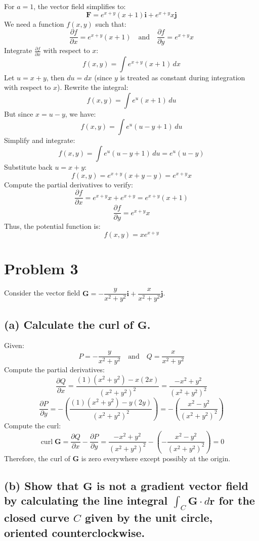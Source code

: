 \documentclass[11pt]{article}
\begin{document}
For $a = 1$, the vector field simplifies to:
\[
\mathbf{F} = e^{x + y} (x + 1)\mathbf{i} + e^{x + y} x \mathbf{j}
\]
We need a function $f(x, y)$ such that:
\[
\frac{\partial f}{\partial x} = e^{x + y} (x + 1) \quad \text{and} \quad \frac{\partial f}{\partial y} = e^{x + y} x
\]
Integrate $\frac{\partial f}{\partial x}$ with respect to $x$:
\[
f(x, y) = \int e^{x + y} (x + 1) \, dx
\]
Let $u = x + y$, then $du = dx$ (since $y$ is treated as constant during integration with respect to $x$). Rewrite the integral:
\[
f(x, y) = \int e^{u} (x + 1) \, du
\]
But since $x = u - y$, we have:
\[
f(x, y) = \int e^{u} (u - y + 1) \, du
\]
Simplify and integrate:
\[
f(x, y) = \int e^{u} (u - y + 1) \, du = e^{u} (u - y)
\]
Substitute back $u = x + y$:
\[
f(x, y) = e^{x + y} (x + y - y) = e^{x + y} x
\]
Compute the partial derivatives to verify:
\[
\frac{\partial f}{\partial x} = e^{x + y} x + e^{x + y} = e^{x + y} (x + 1)
\]
\[
\frac{\partial f}{\partial y} = e^{x + y} x
\]
Thus, the potential function is:
\[
f(x, y) = x e^{x + y}
\]

\newpage

\section{Problem 3}

Consider the vector field $\mathbf{G} = -\dfrac{y}{x^2 + y^2} \mathbf{i} + \dfrac{x}{x^2 + y^2} \mathbf{j}$.

\newpage

\subsection{(a) Calculate the curl of $\mathbf{G}$.}

Given:
\[
P = -\dfrac{y}{x^2 + y^2} \quad \text{and} \quad Q = \dfrac{x}{x^2 + y^2}
\]
Compute the partial derivatives:
\[
\frac{\partial Q}{\partial x} = \frac{(1)(x^2 + y^2) - x(2x)}{(x^2 + y^2)^2} = \frac{-x^2 + y^2}{(x^2 + y^2)^2}
\]
\[
\frac{\partial P}{\partial y} = -\left( \frac{(1)(x^2 + y^2) - y(2y)}{(x^2 + y^2)^2} \right) = -\left( \frac{x^2 - y^2}{(x^2 + y^2)^2} \right)
\]
Compute the curl:
\[
\operatorname{curl} \mathbf{G} = \frac{\partial Q}{\partial x} - \frac{\partial P}{\partial y} = \frac{-x^2 + y^2}{(x^2 + y^2)^2} - \left( -\frac{x^2 - y^2}{(x^2 + y^2)^2} \right) = 0
\]
Therefore, the curl of $\mathbf{G}$ is zero everywhere except possibly at the origin.

\newpage

\subsection{(b) Show that $\mathbf{G}$ is not a gradient vector field by calculating the line integral $\displaystyle \int_{C} \mathbf{G} \cdot d\mathbf{r}$ for the closed curve $C$ given by the unit circle, oriented counterclockwise.}
\end{document}

